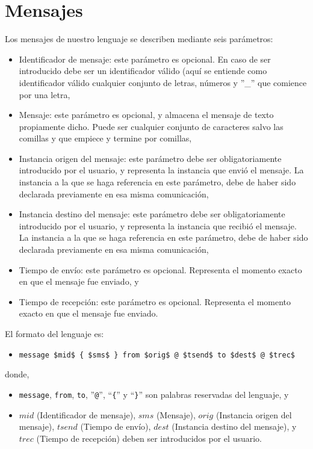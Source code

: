 \section{Mensajes}\label{sec:Mensajes}

Los mensajes de nuestro lenguaje se describen mediante seis
parámetros:

\begin{itemize}
\item Identificador de mensaje: este parámetro es opcional. En caso de
  ser introducido debe ser un identificador válido (aquí se entiende
  como identificador válido cualquier conjunto de letras, números y
  ''\_'' que comience por una letra,
\item Mensaje: este parámetro es opcional, y almacena el mensaje de
  texto propiamente dicho. Puede ser cualquier conjunto de caracteres
  salvo las comillas y que empiece y termine por comillas,
\item Instancia origen del mensaje: este parámetro debe ser
  obligatoriamente introducido por el usuario, y representa la
  instancia que envió el mensaje. La instancia a la que se haga
  referencia en este parámetro, debe de haber sido declarada
  previamente en esa misma comunicación,
\item Instancia destino del mensaje: este parámetro debe ser
  obligatoriamente introducido por el usuario, y representa la
  instancia que recibió el mensaje. La instancia a la que se haga
  referencia en este parámetro, debe de haber sido declarada
  previamente en esa misma comunicación,
\item Tiempo de envío: este parámetro es opcional. Representa el
  momento exacto en que el mensaje fue enviado, y
\item Tiempo de recepción: este parámetro es opcional. Representa el
  momento exacto en que el mensaje fue enviado.
\end{itemize}

El formato del lenguaje es:

\begin{itemize}
\item \lstinline[mathescape]!message $mid$ { $sms$ } from $orig$ @ $tsend$ to $dest$ @ $trec$!
\end{itemize}

donde,
\begin{itemize}
\item \lstinline{message}, \lstinline{from}, \lstinline{to},
  ''\lstinline{@}'', ``\lstinline!{!'' y ``\lstinline!}!'' son
  palabras reservadas del lenguaje, y
\item $mid$ (Identificador de mensaje), $sms$ (Mensaje), $orig$
  (Instancia origen del mensaje), $tsend$ (Tiempo de envío), $dest$
  (Instancia destino del mensaje), y $trec$ (Tiempo de recepción)
  deben ser introducidos por el usuario.
\end{itemize}

